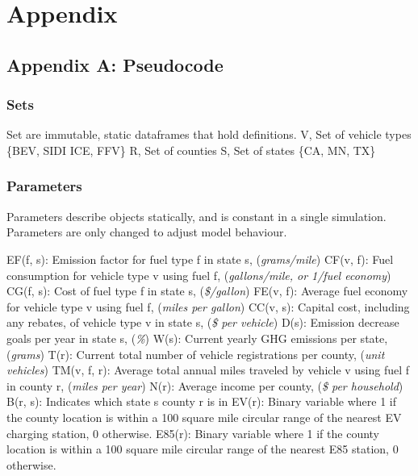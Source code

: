 \documentclass[answers]{exam}
\begin{document}
\section{Appendix}
\subsection{Appendix A: Pseudocode}
\subsubsection{Sets}
\begin{outline}
\1 Set are immutable, static dataframes that hold definitions.
\2 V,  	Set of vehicle types \{BEV, SIDI ICE, FFV\}
\2 R,  	Set of counties
\2 S, Set of states \{CA, MN, TX\} 
\end{outline}

\subsubsection{Parameters}
\begin{outline}
\1 Parameters describe objects statically, and is constant in a single simulation. Parameters are only changed to adjust model behaviour.

\2 EF(f, s): Emission factor for fuel type f in state s, (\textit{grams/mile})
\2 CF(v, f): Fuel consumption for vehicle type v using fuel f, (\textit{gallons/mile, or 1/fuel economy})
\2 CG(f, s): Cost of fuel type f in state s, (\textit{\$/gallon})
\2 FE(v, f): Average fuel economy for vehicle type v using fuel f, (\textit{miles per gallon})
\2 CC(v, s): Capital cost, including any rebates, of vehicle type v in state s, (\textit{\$ per vehicle})
\2 D(s): Emission decrease goals per year in state s, (\textit{\%}) 
\2 W(s): Current yearly GHG emissions per state, (\textit{grams})
\2 T(r): Current total number of vehicle registrations per county, (\textit{unit vehicles}) 
\2 TM(v, f, r): Average total annual miles traveled by vehicle v using fuel f in county r, (\textit{miles per year})
\2 N(r): Average income per county, (\textit{\$ per household}) 
\2 B(r, s): Indicates which state s county r is in 
\2 EV(r): Binary variable where 1 if the county location is within a 100 square mile circular range of the nearest EV charging station, 0 otherwise. 
\2 E85(r): Binary variable where 1 if the county location is within a 100 square mile circular range of the nearest E85 station, 0 otherwise. 

\end{outline}
\end{document}
